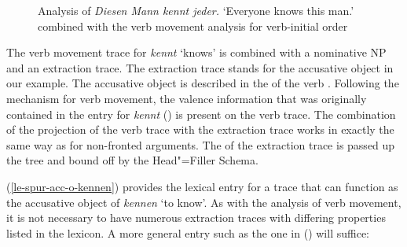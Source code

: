 \begin{figure}
\caption{\label{Abbildung-Diesen-Mann-kennt-jeder}Analysis of \emph{Diesen Mann kennt jeder.} `Everyone knows this man.' combined with the verb movement analysis for verb-initial order}
\end{figure}%
%
The verb movement trace for \emph{kennt} `knows' is combined with a nominative NP and an extraction trace.
The extraction trace stands for the accusative object in our example. The accusative object is
described in the \compsl of the verb . Following the mechanism for verb movement, the valence information that was originally contained
in the entry for \emph{kennt} () is present on the verb trace. The combination of the projection of the verb trace with
the extraction trace works in exactly the same way as for non-fronted arguments. The \slashv of the extraction trace is passed up the tree
and bound off by the Head"=Filler Schema.

(\ref{le-spur-acc-o-kennen}) provides the lexical entry for a trace
that can function as the accusative object of \emph{kennen} `to know'. As with the analysis of verb movement, it is not necessary to have numerous extraction traces with differing properties 
listed in the lexicon. A more general entry such as the one in () will suffice:

